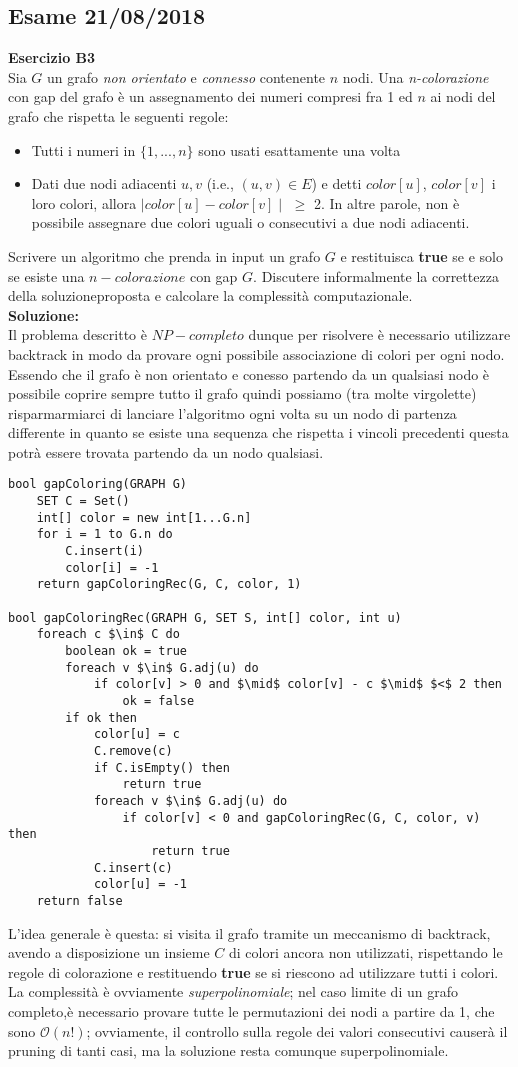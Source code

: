 \documentclass[../cheatSheetAlgoritmi.tex]{subfiles}
\begin{document}
\subsection{Esame 21/08/2018}
\textbf{Esercizio B3}\\
Sia $G$ un grafo \emph{non orientato} e \emph{connesso} contenente $n$ nodi. Una \emph{n-colorazione} con gap del grafo è un assegnamento dei numeri compresi fra 1 ed $n$ ai nodi del grafo che rispetta le seguenti regole:
\begin{itemize}
	\item Tutti i numeri in $\{1,...,n\}$ sono usati esattamente una volta
	\item Dati due nodi adiacenti $u, v$ (i.e., $(u, v) \in E$) e detti $color[u]$, $color[v]$ i  loro  colori,  allora $\mid color[u] - color[v] \mid$ $\geq$ 2. In altre parole, non è possibile assegnare due colori uguali o consecutivi a due nodi adiacenti.
\end{itemize}
Scrivere un algoritmo che prenda in input un grafo $G$ e restituisca \textbf{true} se e solo se esiste una $n-colorazione$ con gap $G$. Discutere informalmente la correttezza   della soluzioneproposta e calcolare la complessità computazionale.\\
\textbf{Soluzione:}\\
Il problema descritto è $NP-completo$ dunque per risolvere è necessario utilizzare backtrack in modo da provare ogni possibile associazione di colori per ogni nodo. Essendo che il grafo è non orientato e conesso partendo da un qualsiasi nodo è possibile coprire sempre tutto il grafo quindi possiamo (tra molte virgolette) risparmarmiarci di lanciare l'algoritmo ogni volta su un nodo di partenza differente in quanto se esiste una sequenza che rispetta i vincoli precedenti questa potrà essere trovata partendo da un nodo qualsiasi.
\begin{lstlisting}[caption=n-Colorazione (gapColoring)]
bool gapColoring(GRAPH G)
	SET C = Set()
	int[] color = new int[1...G.n]
	for i = 1 to G.n do
		C.insert(i)
		color[i] = -1
	return gapColoringRec(G, C, color, 1)
	
bool gapColoringRec(GRAPH G, SET S, int[] color, int u)
	foreach c $\in$ C do
		boolean ok = true
		foreach v $\in$ G.adj(u) do
			if color[v] > 0 and $\mid$ color[v] - c $\mid$ $<$ 2 then
				ok = false
		if ok then
			color[u] = c
			C.remove(c)
			if C.isEmpty() then
				return true
			foreach v $\in$ G.adj(u) do
				if color[v] < 0 and gapColoringRec(G, C, color, v) then
					return true
			C.insert(c)
			color[u] = -1
	return false
\end{lstlisting}
L'idea generale è questa: si visita il grafo tramite un meccanismo di backtrack, avendo a disposizione un insieme $C$ di colori ancora non utilizzati, rispettando le regole di colorazione e restituendo \textbf{true} se si riescono ad utilizzare tutti i colori. La complessità è ovviamente \emph{superpolinomiale}; nel caso limite di un grafo completo,è necessario provare tutte le permutazioni dei nodi a partire da 1, che sono $\mathcal{O}(n!)$; ovviamente, il controllo sulla regole dei valori consecutivi causerà il pruning di tanti casi, ma la soluzione resta comunque superpolinomiale.
\newpage
\end{document}
